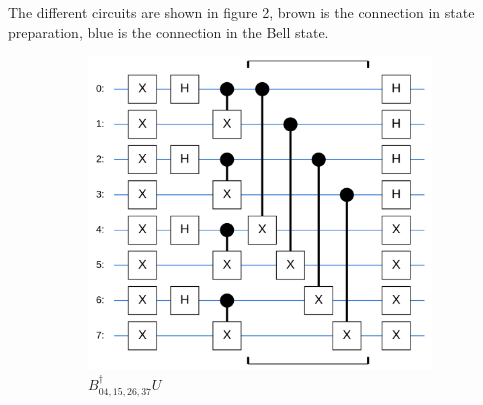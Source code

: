 \documentclass[a4paper,11pt,aps,tightenlines,nofootinbib]{revtex4}
\begin{document}
        The different circuits are shown in figure 2, 
        brown is the connection in state preparation, blue is the connection in the Bell state.

        \begin{figure}[h] \label{dipole-topology}
                \begin{subfigure}[b]{.4\textwidth}
                \includegraphics[scale=.2]{images/dipole_disjoint_circuit.png}
                \caption{$B^\dagger_{04,15,26,37}U$ \cite{cirq}}
                \end{subfigure}
                \begin{subfigure}[b]{.3\textwidth}

\end{subfigure}
\end{figure}
\end{document}
